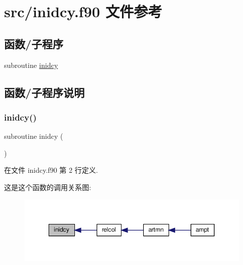 \hypertarget{inidcy_8f90}{}\section{src/inidcy.f90 文件参考}
\label{inidcy_8f90}
\subsection*{函数/子程序}
\begin{DoxyCompactItemize}
\item 
subroutine \mbox{\hyperlink{inidcy_8f90_a7017920feabb1ba1a40c1a742261b9c9}{inidcy}}
\end{DoxyCompactItemize}


\subsection{函数/子程序说明}
\mbox{\label{inidcy_8f90_a7017920feabb1ba1a40c1a742261b9c9}} 
\subsubsection{\texorpdfstring{inidcy()}{inidcy()}}
{\footnotesize\ttfamily subroutine inidcy (\begin{DoxyParamCaption}{ }\end{DoxyParamCaption})}



在文件 inidcy.\+f90 第 2 行定义.

这是这个函数的调用关系图\+:
\nopagebreak
\begin{figure}[H]
\begin{center}
\leavevmode
\includegraphics[width=349pt]{inidcy_8f90_a7017920feabb1ba1a40c1a742261b9c9_icgraph}
\end{center}
\end{figure}
